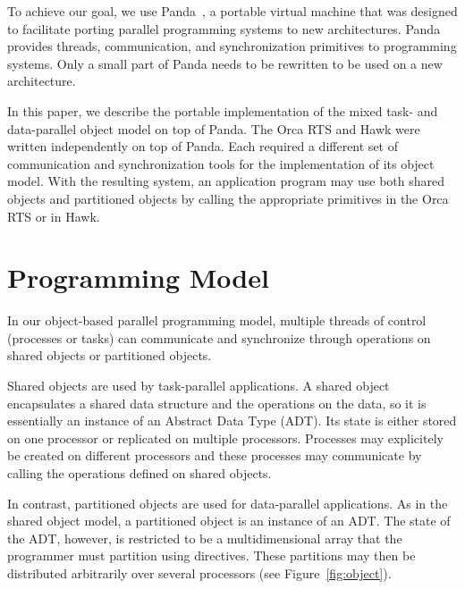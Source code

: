 \documentclass{article}
\begin{document}
To achieve our goal, we use Panda~\cite{bhoedjang93}, a portable
virtual machine that was designed to facilitate porting parallel
programming systems to new architectures. Panda provides threads,
communication, and synchronization primitives to programming
systems. Only a small part of Panda needs to be rewritten to be used
on a new architecture.

In this paper, we describe the portable implementation of the mixed
task- and data-parallel object model on top of Panda. The Orca RTS
and Hawk were written independently on top of Panda. Each required a
different set of communication and synchronization tools for the
implementation of its object model. With the resulting system, an
application program may use both shared objects and partitioned
objects by calling the appropriate primitives in the Orca RTS or in
Hawk.

\section{Programming Model}

In our object-based parallel programming model, multiple threads of
control (processes or tasks) can communicate and synchronize through
operations on shared objects or partitioned objects.

Shared objects are used by task-parallel applications. A shared object
encapsulates a shared data structure and the operations on the data,
so it is essentially an instance of an Abstract Data Type (ADT). Its
state is either stored on one processor or replicated on multiple
processors. Processes may explicitely be created on different
processors and these processes may communicate by calling the
operations defined on shared objects.

In contrast, partitioned objects are used for data-parallel
applications. As in the shared object model, a partitioned
object is an instance of an ADT. The state of the ADT, however, is
restricted to be a multidimensional array that the programmer must
partition using directives. These partitions may then be distributed
arbitrarily over several processors (see Figure~\ref{fig:object}).

\begin{figure*}[htbp]
  \begin{center}
    \leavevmode
    
    \caption{Example of a partitioned object. The state of the object 
      is partitioned column-wise and the columns are distributed over three
      processors.}
    \label{fig:object}
  \end{center}
\end{figure*}
\end{document}
